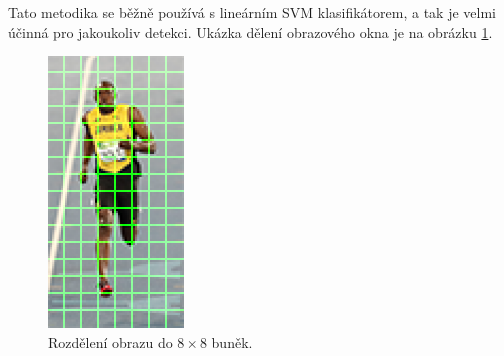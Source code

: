 Tato metodika se běžně používá s lineárním SVM klasifikátorem, a tak je velmi účinná pro jakoukoliv detekci. 
Ukázka dělení obrazového okna je na obrázku \ref{hog_cells}.

 \begin{figure}[H]
\centering
\includegraphics[width=3.6cm]{figures/hog_cells}
\caption{Rozdělení obrazu do $8\times8$ buněk. \cite{hog:obr}}
\label{hog_cells}
\end{figure}

